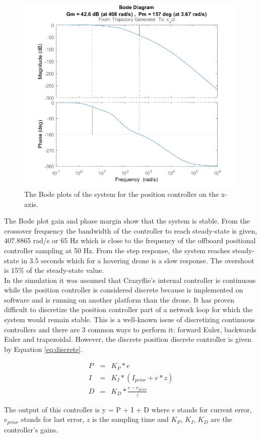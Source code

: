 \begin{figure}[H]
\centering
 \includegraphics[width=\textwidth]{Figures/bode.png}
 \caption{The Bode plots of the system for the position controller on the x-axis.}
 \label{figure:bode}
\end{figure}

The Bode plot gain and phase margin show that the system is stable. From the crossover frequency the bandwidth of the controller to reach steady-state is given, 407.8865 rad/s or 65 Hz which is close to the frequency of the offboard positional controller sampling at 50 Hz. From the step response, the system reaches steady-state in 3.5 seconds which for a hovering drone is a slow response. The overshoot is 15\% of the steady-state value. \\

In the simulation it was assumed that Crazyflie's internal controller is continuous while the position controller is considered discrete because is implemented on software and is running on another platform than the drone. It has proven difficult to discretize the position controller part of a network loop for which the system would remain stable. This is a well-known issue of discretizing continuous controllers and there are 3 common ways to perform it: forward Euler, backwards Euler and trapezoidal. However, the discrete position discrete controller is given by Equation \ref{eq:discrete}.

\begin{eqnarray}{}
	P &= & K_P * e\\
	I &= & K_I * (I_{prior} + e*z) \\
	D &= & K_D * \frac{e - e_{prior}}{z}
	\label{eq:discrete}
\end{eqnarray}

The output of this controller is y = P + I + D where $e$ stands for current error, $e_{prior}$ stands for last error, $z$ is the sampling time and $K_P$, $K_I$, $K_D$ are the controller's gains.

